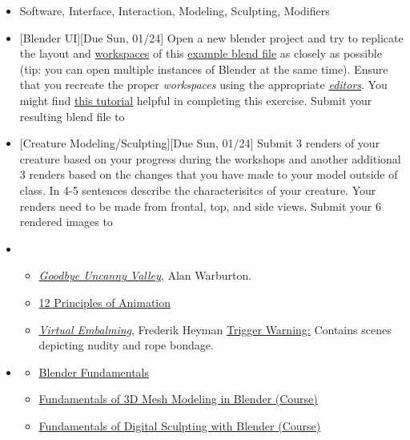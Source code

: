 \def\dMon{Mon, 01/18}
\def\dTues{Tues, 01/19}
\def\dWed{Wed, 01/20}
\def\dThur{Thur, 01/21}
\def\dFri{Fri, 01/22}
\def\dSat{Sat, 01/23}
\def\dSun{Sun, 01/24}
\placeDate

\begin{itemize}[noitemsep,topsep=0pt,leftmargin=*]
      \item {} Software, Interface, Interaction, Modeling, Sculpting, Modifiers
      \item {}[Blender UI][Due \dSun] Open a new blender project and try to replicate the layout and \href{https://docs.blender.org/manual/en/latest/interface/window_system/workspaces.html}{workspaces} of this \href{supplements/3001-Ex1.blend}{example blend file} as closely as possible (tip: you can open multiple instances of Blender at the same time). Ensure that you recreate the proper \emph{workspaces} using the appropriate \href{https://docs.blender.org/manual/en/latest/editors/index.html}{\emph{editors}}. You might find \href{https://youtu.be/7DNmaR7TKwU}{this tutorial} helpful in completing this exercise. Submit your resulting blend file to \discordE
      \item {}[Creature Modeling/Sculpting][Due \dSun] Submit 3 renders of your creature based on your progress during the workshops and another additional 3 renders based on the changes that you have made to your model outside of class. In 4-5 sentences describe the characterisitcs of your creature. Your renders need to be made from frontal, top, and side views. Submit your 6 rendered images to \discordE
      \item {}
            \begin{itemize}
                  \item \href{https://alanwarburton.co.uk/goodbye-uncanny-valley}{\emph{Goodbye Uncanny Valley}}, Alan Warburton.
                  \item \href{https://www.youtube.com/watch?v=uDqjIdI4bF4}{12 Principles of Animation }
                  \item \href{https://www.nowness.com/story/virtual-embalming-frederik-heyman}{\emph{Virtual Embalming}}, Frederik Heyman \newline
                        \small{\ul{Trigger Warning:} Contains scenes depicting nudity and rope bondage.}
            \end{itemize}
      \item {}
            \begin{resenv}
                  \begin{itemize}
                        \item \href{https://cloud.blender.org/p/blender-fundamentals/}{Blender Fundamentals}
                        \item \href{http://bit.ly/39jpRN5}{Fundamentals of 3D Mesh Modeling in Blender (Course)}
                        \item \href{http://bit.ly/38urSXu}{Fundamentals of Digital Sculpting with Blender (Course)}
                  \end{itemize}
            \end{resenv}
\end{itemize}